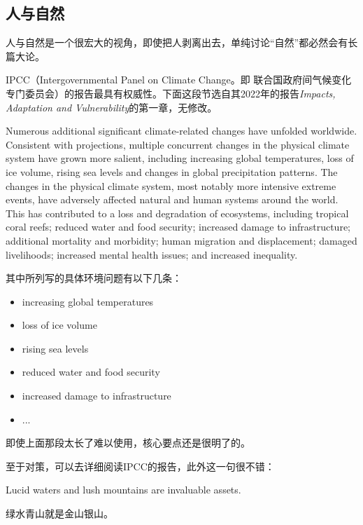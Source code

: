 \subsection{人与自然}
人与自然是一个很宏大的视角，即使把人剥离出去，单纯讨论“自然”都必然会有长篇大论。
\par
IPCC（Intergovernmental Panel on Climate Change。即
联合国政府间气候变化专门委员会）的报告最具有权威性。下面这段节选自其2022年的报告\textit{Impacts, Adaptation and Vulnerability}的第一章，无修改。
\par
Numerous additional significant climate-related changes have unfolded worldwide. Consistent with projections, multiple concurrent changes in the physical climate system have grown more salient, including increasing global temperatures, loss of ice volume, rising sea levels and changes in global precipitation patterns. The changes in the physical climate system, most notably more intensive extreme events, have adversely affected natural and human systems around the world. This has contributed to a loss and degradation of ecosystems, including tropical coral reefs; reduced water and food security; increased damage to infrastructure; additional mortality and morbidity; human migration and displacement; damaged livelihoods; increased mental health issues; and increased inequality.
\par
其中所列写的具体环境问题有以下几条：
\begin{itemize}
    \item increasing global temperatures
    \item loss of ice volume
    \item rising sea levels
    \item reduced water and food security
    \item increased damage to infrastructure
    \item ...
\end{itemize}
\par
即使上面那段太长了难以使用，核心要点还是很明了的。
\par
至于对策，可以去详细阅读IPCC的报告，此外这一句很不错：
\par
Lucid waters and lush mountains are invaluable assets.
\par
绿水青山就是金山银山。
